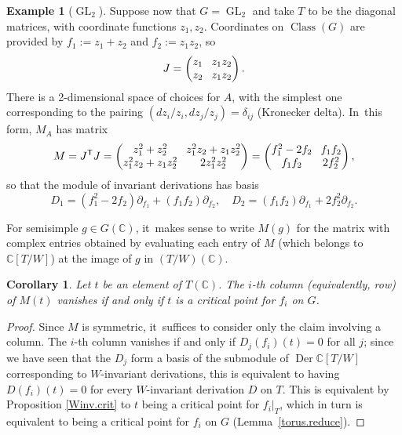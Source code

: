 \documentclass[JEP,XML,SOM,Unicode,NoFloatCountersInSection,published]{cedram}
\newtheorem{cor}[equation]{Corollary}
\theoremstyle{definition}
\newtheorem{example}[equation]{Example}
\newcommand{\trans}{\mathsf{T}}
\newcommand{\C}{\mathbb{C}}
\DeclareMathOperator{\GL}{GL}
\DeclareMathOperator{\class}{Class}
\newcommand{\ClG}{\class(G)}
\DeclareMathOperator{\Der}{Der}
\begin{document}
\begin{example}[$\GL_2$] \label{GL2.eg2}
Suppose now that $G = \GL_2$ and take $T$ to be the diagonal matrices,
with coordinate functions $z_1, z_2$. Coordinates on $\ClG$ are provided
by $f_1 := z_1 + z_2$ and $f_2 := z_1 z_2$, so
\[\arraycolsep4pt
J = \begin{pmatrix}
z_1 & z_1 z_2 \\
z_2 & z_1 z_2
\end{pmatrix}.
\]
There is a 2-dimensional space of choices for $A$, with the simplest one
corresponding to the pairing $(dz_i/z_i,dz_j/z_j)=\delta_{ij}$ (Kronecker delta). In~this
form, $M_A$ has matrix
\[\arraycolsep4pt
M = J^\trans J = 
\begin{pmatrix}
z_1^2 + z_2^2 & z_1^2 z_2 + z_1 z_2^2 \\
z_1^2 z_2 + z_1 z_2^2 & 2z_1^2 z_2^2
\end{pmatrix} =
\begin{pmatrix}
f_1^2 - 2f_2 & f_1 f_2 \\
f_1 f_2 & 2f_2^2
\end{pmatrix},
\]
so that the module of invariant derivations has basis
\[
D_1=(f_1^2-2f_2)\partial_{f_1} + (f_1f_2)\partial_{f_2}, \quad
D_2=(f_1f_2)\partial_{f_1}+2f_2^2\partial_{f_2}.
\]
\end{example}

For semisimple $g \in G(\C)$, it~makes sense to write $M(g)$ for the matrix with complex entries obtained by evaluating each entry of $M$ (which belongs to $\C[T/W]$) at the image of $g$ in $(T/W)(\C)$.

\begin{cor} \label{fi.crit}
Let $t$ be an element of $T(\C)$. The $i$-th column (equivalently, row) of $M(t)$ vanishes if and only if $t$ is a critical point for $f_i$ on $G$.
\end{cor}

\begin{proof}
Since $M$ is symmetric, it~suffices to consider only the claim involving a
column. The $i$-th column vanishes if and only if $D_j(f_i)(t) = 0$ for
all $j$; since we have seen that the $D_j$ form a basis of the submodule of
$\Der \C[T/W]$ corresponding to $W$\nobreakdash-invariant derivations, this is
equivalent to having $D(f_i)(t)=0$ for every $W$\nobreakdash-invariant derivation $D$
on $T$. This is equivalent by Proposition \ref{Winv.crit} to $t$ being a
critical point for $f_i\vert_T$, which in turn is equivalent to being a
critical point for $f_i$ on $G$ (Lemma~\ref{torus.reduce}).
\end{proof}
\end{document}
